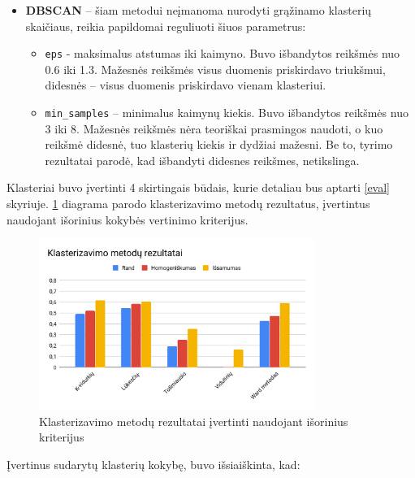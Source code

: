 \documentclass{VUMIFInfBakalaurinis}
\begin{document}
\begin{itemize}
\item
  \textbf{DBSCAN} -- šiam metodui neįmanoma nurodyti grąžinamo klasterių
  skaičiaus, reikia papildomai reguliuoti šiuos parametrus:

  \begin{itemize}
  \item
    \texttt{eps} - maksimalus atstumas iki kaimyno. Buvo išbandytos reikšmės nuo
    0.6 iki 1.3. Mažesnės reikšmės visus duomenis priskirdavo triukšmui,
    didesnės -- visus duomenis priskirdavo vienam klasteriui.
  \item
    \texttt{min\_samples} -- minimalus kaimynų kiekis. Buvo išbandytos reikšmės
    nuo 3 iki 8. Mažesnės reikšmės nėra teoriškai prasmingos naudoti, o
    kuo reikšmė didesnė, tuo klasterių kiekis ir dydžiai mažesni. Be to,
    tyrimo rezultatai parodė, kad išbandyti didesnes reikšmes,
    netikslinga.
  \end{itemize}
\end{itemize}

Klasteriai buvo įvertinti 4 skirtingais būdais, kurie detaliau bus
aptarti \ref{eval} skyriuje. \ref{clusters} diagrama parodo klasterizavimo metodų rezultatus,
įvertintus naudojant išorinius kokybės vertinimo kriterijus.

\begin{figure}[H]
	\centering
	\includegraphics[width=0.8\textwidth]{./img/image27.png}
  \caption{Klasterizavimo metodų rezultatai įvertinti naudojant išorinius
  kriterijus}
  \label{clusters}
\end{figure}

Įvertinus sudarytų klasterių kokybę, buvo išsiaiškinta, kad:
\end{document}
